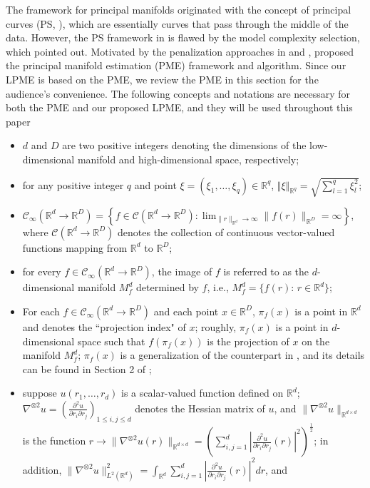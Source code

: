 \documentclass[11pt,reqno]{article}
\theoremstyle{definition}
\begin{document}
The framework for principal manifolds originated with the concept of principal curves (PS, \cite{hastiePrincipalCurves1989}), which are essentially curves that pass through the middle of the data. However, the PS framework in \cite{hastiePrincipalCurves1989} is flawed by the model complexity selection, which \cite{duchamp1996extremal} pointed out. Motivated by the penalization approaches in \cite{kegl2000learning} and \cite{smolaRegularizedPrincipalManifolds2001}, \cite{mengPrincipalManifoldEstimation2021} proposed the principal manifold estimation (PME) framework and algorithm. Since our LPME is based on the PME, we review the PME in this section for the audience's convenience. The following concepts and notations are necessary for both the PME and our proposed LPME, and they will be used throughout this paper
\begin{itemize}
\item $d$ and $D$ are two positive integers denoting the dimensions of the low-dimensional manifold and high-dimensional space, respectively; 
\item for any positive integer $q$ and point $\xi=(\xi_1,\ldots,\xi_q)\in\mathbb{R}^q$, $\Vert \xi\Vert_{\mathbb{R}^q}=\sqrt{\sum_{l=1}^q \xi_l^2}$;
    \item $\mathcal{C}_{\infty}(\mathbb{R}^{d} \to \mathbb{R}^{D}) = \left\{f \in \mathcal{C}(\mathbb{R}^{d} \to \mathbb{R}^{D}): \lim_{\|r\|_{\mathbb{R}^{d}} \to \infty}\|f(r)\|_{\mathbb{R}^{D}} = \infty\right\}$, where $\mathcal{C}(\mathbb{R}^{d} \to \mathbb{R}^{D})$ denotes the collection of continuous vector-valued functions mapping from $\mathbb{R}^d$ to $\mathbb{R}^D$; 
    \item for every $f\in \mathcal{C}_{\infty}(\mathbb{R}^{d} \to \mathbb{R}^{D})$, the image of $f$ is referred to as the $d$-dimensional manifold $M_f^d$ determined by $f$, i.e., $M_f^d=\{f(r):\,r\in\mathbb{R}^d\}$;
    \item For each $f\in \mathcal{C}_{\infty}(\mathbb{R}^{d} \to \mathbb{R}^{D})$ and each point $x\in\mathbb{R}^D$, $\pi_f(x)$ is a point in $\mathbb{R}^d$ and denotes the ``projection index" of $x$; roughly, $\pi_f(x)$ is a point in $d$-dimensional space such that $f(\pi_f(x))$ is the projection of $x$ on the manifold $M_f^d$; $\pi_f(x)$ is a generalization of the counterpart in \cite{hastiePrincipalCurves1989}, and its details can be found in Section 2 of \cite{mengPrincipalManifoldEstimation2021};
    \item suppose $u(r_1,\ldots,r_d)$ is a scalar-valued function defined on $\mathbb{R}^d$; $\nabla^{\otimes 2}u=\left(\frac{\partial^2 u}{\partial r_i \partial r_j}\right)_{1\le i,j\le d}$ denotes the Hessian matrix of $u$, and $\|\nabla^{\otimes 2}u\|_{\mathbb{R}^{d \times d}}$ is the function $r \to \|\nabla^{\otimes 2} u(r)\|_{\mathbb{R}^{d \times d}} = \left(\sum_{i, j = 1}^{d}\left|\frac{\partial^2 u}{\partial r_i \partial r_j}(r)\right|^2\right)^{\frac{1}{2}}$; in addition, $\|\nabla^{\otimes 2} u\|_{L^2(\mathbb{R}^{d})}^2 = \int_{\mathbb{R}^{d}}\sum_{i, j = 1}^{d}\left|\frac{\partial^2 u}{\partial r_i \partial r_j}(r)\right|^2dr $, and 

\end{itemize}
\end{document}

